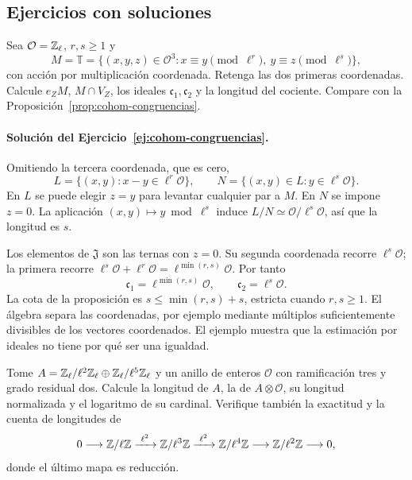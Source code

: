 \subsection{Ejercicios con soluciones}

\begin{ejercicio}\label{ej:cohom-congruencias}
Sea $\mathcal O=\mathbb{Z}_\ell$, $r,s\ge1$ y
\[
 M=\mathbb T
 =\{(x,y,z)\in\mathcal O^3:
          x\equiv y\pmod{\ell^r},\
          y\equiv z\pmod{\ell^s}\},
\]
con acción por multiplicación coordenada.
Retenga las dos primeras coordenadas.
Calcule $e_ZM$, $M\cap V_Z$, los ideales
$\mathfrak c_1,\mathfrak c_2$ y la longitud del
cociente. Compare con la
Proposición~\ref{prop:cohom-congruencias}.
\end{ejercicio}

\paragraph{Solución del Ejercicio~\ref{ej:cohom-congruencias}.}
Omitiendo la tercera coordenada, que es cero,
\[
 L=\{(x,y):x-y\in\ell^r\mathcal O\},\qquad
 N=\{(x,y)\in L:y\in\ell^s\mathcal O\}.
\]
En $L$ se puede elegir $z=y$ para levantar cualquier
par a $M$. En $N$ se impone $z=0$.
La aplicación $(x,y)\mapsto y\bmod\ell^s$ induce
$L/N\simeq\mathcal O/\ell^s\mathcal O$, así que la
longitud es $s$.

Los elementos de $\mathfrak J$ son las ternas con $z=0$.
Su segunda coordenada recorre $\ell^s\mathcal O$;
la primera recorre
$\ell^s\mathcal O+\ell^r\mathcal O
 =\ell^{\min(r,s)}\mathcal O$.
Por tanto
\[
 \mathfrak c_1=\ell^{\min(r,s)}\mathcal O,\qquad
 \mathfrak c_2=\ell^s\mathcal O.
\]
La cota de la proposición es $s\le\min(r,s)+s$, estricta
cuando $r,s\ge1$.
El álgebra separa las coordenadas, por ejemplo mediante
múltiplos suficientemente divisibles de los vectores
coordenados. El ejemplo muestra que la estimación por
ideales no tiene por qué ser una igualdad.

\begin{ejercicio}\label{ej:cohom-normalizacion}
Tome $A=\mathbb{Z}_\ell/\ell^2\mathbb{Z}_\ell\oplus
\mathbb{Z}_\ell/\ell^5\mathbb{Z}_\ell$ y un anillo de enteros
$\mathcal O$ con ramificación tres y grado residual dos.
Calcule la longitud de $A$, la de $A\otimes\mathcal O$,
su longitud normalizada y el logaritmo de su cardinal.
Verifique también la exactitud y la cuenta de longitudes de
\[
 0\longrightarrow\mathbb{Z}/\ell\mathbb{Z}
 \xrightarrow{\ \ell^2\ }\mathbb{Z}/\ell^3\mathbb{Z}
 \xrightarrow{\ \ell^2\ }\mathbb{Z}/\ell^4\mathbb{Z}
 \longrightarrow\mathbb{Z}/\ell^2\mathbb{Z}\longrightarrow0,
\]
donde el último mapa es reducción.
\end{ejercicio}

